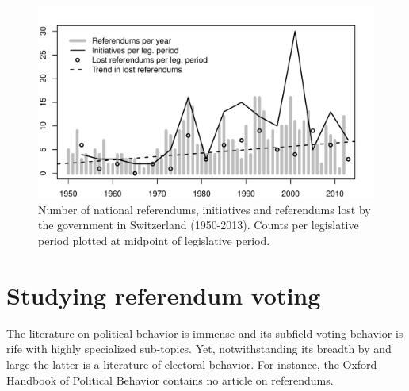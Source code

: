 \documentclass[11pt,a4paper]{article}\usepackage[]{graphicx}\usepackage[]{color}
\makeatletter
\def\maxwidth{ %
  \ifdim\Gin@nat@width>\linewidth
    \linewidth
  \else
    \Gin@nat@width
  \fi
}
\newenvironment{knitrout}{}{} %
\makeatother
\begin{document}
\begin{figure}[!htb]
\centering
\begin{knitrout}
\color{fgcolor}

{\centering \includegraphics[width=\maxwidth]{figure/fig1-1} 

}



\end{knitrout}
\caption{Number of national referendums, initiatives and referendums lost by the government in Switzerland (1950-2013). Counts per legislative period plotted at midpoint of legislative period.}\label{fig}
\end{figure}

\section{Studying referendum voting}\label{sec:litreview}

    The literature on political behavior is immense and its subfield voting behavior is rife with highly specialized sub-topics. Yet, notwithstanding its breadth by and large the latter is a literature of electoral behavior. For instance, the Oxford Handbook of Political Behavior \citep{dalton_oxford_2007} contains no article on referendums. 
	
\end{document}
